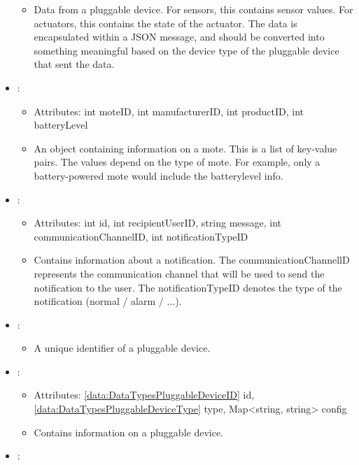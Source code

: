 \begin{itemize}[nolistsep,noitemsep]
\begin{itemize}[noitemsep,nolistsep]
\item[] Data from a pluggable device. For sensors, this contains sensor values. For actuators, this contains the state of the actuator. The data is encapsulated within a JSON message, and should be converted into something meaningful based on the device type of the pluggable device that sent the data.
\end{itemize}
\item {}: 
\begin{itemize}[noitemsep,nolistsep]
\item[] Attributes: int moteID, int manufacturerID, int productID, int batteryLevel
\item[] An object containing information on a mote. This is a list of key-value pairs. The values depend on the type of mote. For example, only a battery-powered mote would include the batterylevel info.
\end{itemize}
\item {}: 
\begin{itemize}[noitemsep,nolistsep]
\item[] Attributes: int id, int recipientUserID, string message, int communicationChannelID, int notificationTypeID
\item[] Contains information about a notification. The communicationChannellD represents the communication channel that will be used to send the notification to the user. The notificationTypeID denotes the type of the notification (normal / alarm / ...).
\end{itemize}
\item {}: 
\begin{itemize}[noitemsep,nolistsep]

\item[] A unique identifier of a pluggable device.
\end{itemize}
\item {}: 
\begin{itemize}[noitemsep,nolistsep]
\item[] Attributes: \ref{data:DataTypesPluggableDeviceID} id, \ref{data:DataTypesPluggableDeviceType} type, Map\textless{}string, string\textgreater{} config
\item[] Contains information on a pluggable device.
\end{itemize}
\item {}: 
\begin{itemize}


\end{itemize}
\end{itemize}
